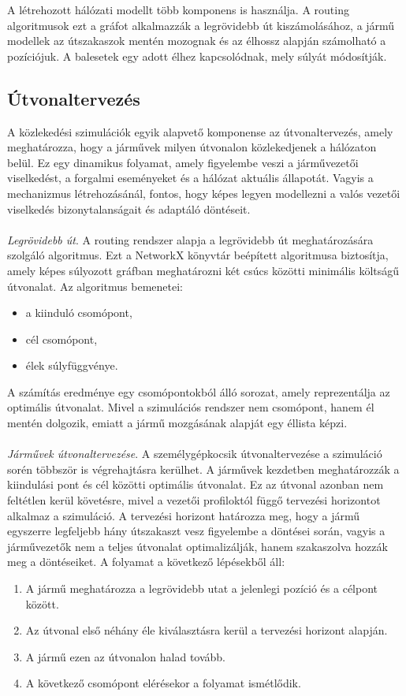 \documentclass[14pt,a4paper]{extarticle}
\begin{document}
A létrehozott hálózati modellt több komponens is használja. A routing algoritmusok ezt a gráfot alkalmazzák a legrövidebb út kiszámolásához, a jármű modellek az útszakaszok mentén mozognak és az élhossz alapján számolható a pozíciójuk. A balesetek egy adott élhez kapcsolódnak, mely súlyát módosítják.
\subsection{Útvonaltervezés}
A közlekedési szimulációk egyik alapvető komponense az útvonaltervezés, amely meghatározza, hogy a járművek milyen útvonalon közlekedjenek a hálózaton belül. Ez egy dinamikus folyamat, amely figyelembe veszi a járművezetői viselkedést, a forgalmi eseményeket és a hálózat aktuális állapotát. Vagyis a mechanizmus létrehozásánál, fontos, hogy képes legyen modellezni a valós vezetői viselkedés bizonytalanságait és adaptáló döntéseit.
\\
\\
\textit{Legrövidebb út}. A routing rendszer alapja a legrövidebb út meghatározására szolgáló algoritmus. Ezt a NetworkX könyvtár beépített algoritmusa biztosítja, amely képes súlyozott gráfban meghatározni két csúcs közötti minimális költságű útvonalat. Az algoritmus bemenetei:
\begin{itemize}
    \item a kiinduló csomópont,
    \item cél csomópont,
    \item élek súlyfüggvénye.
\end{itemize}
A számítás eredménye egy csomópontokból álló sorozat, amely reprezentálja az optimális útvonalat. Mivel a szimulációs rendszer nem csomópont, hanem él mentén dolgozik, emiatt a jármű mozgásának alapját egy éllista képzi.
\\
\\
\textit{Járművek útvonaltervezése}. A személygépkocsik útvonaltervezése a szimuláció sorén többször is végrehajtásra kerülhet. A járművek kezdetben meghatározzák a kiindulási pont és cél közötti optimális útvonalat. Ez az útvonal azonban nem feltétlen kerül követésre, mivel a vezetői profiloktól függő tervezési horizontot alkalmaz a szimuláció. A tervezési horizont határozza meg, hogy a jármű egyszerre legfeljebb hány útszakaszt vesz figyelembe a döntései során, vagyis a járművezetők nem a teljes útvonalat optimalizálják, hanem szakaszolva hozzák meg a döntéseiket. A folyamat a következő lépésekből áll:
\begin{enumerate}
    \item A jármű meghatározza a legrövidebb utat a jelenlegi pozíció és a célpont között.
    \item Az útvonal első néhány éle kiválasztásra kerül a tervezési horizont alapján.
    \item A jármű ezen az útvonalon halad tovább.
    \item A következő csomópont elérésekor a folyamat ismétlődik.
\end{enumerate}
\end{document}
